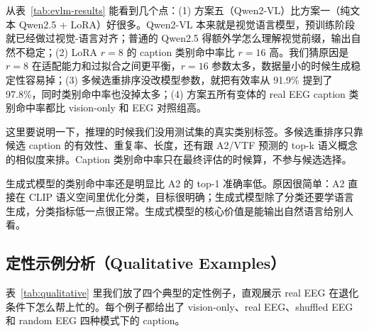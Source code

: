 从表~\ref{tab:evlm-results} 能看到几个点：(1) 方案五（Qwen2-VL）比方案一（纯文本 Qwen2.5 + LoRA）好很多。Qwen2-VL 本来就是视觉语言模型，预训练阶段就已经做过视觉-语言对齐；普通的 Qwen2.5 得额外学怎么理解视觉前缀，输出自然不稳定；(2) LoRA $r=8$ 的 caption 类别命中率比 $r=16$ 高。我们猜原因是 $r=8$ 在适配能力和过拟合之间更平衡，$r=16$ 参数太多，数据量小的时候生成稳定性容易掉；(3) 多候选重排序没改模型参数，就把有效率从 91.9\% 提到了 97.8\%，同时类别命中率也没掉太多；(4) 方案五所有变体的 real EEG caption 类别命中率都比 vision-only 和 EEG 对照组高。

这里要说明一下，推理的时候我们没用测试集的真实类别标签。多候选重排序只靠候选 caption 的有效性、重复率、长度，还有跟 A2/VTF 预测的 top-k 语义概念的相似度来排。Caption 类别命中率只在最终评估的时候算，不参与候选选择。

生成式模型的类别命中率还是明显比 A2 的 top-1 准确率低。原因很简单：A2 直接在 CLIP 语义空间里优化分类，目标很明确；生成式模型除了分类还要学语言生成，分类指标低一点很正常。生成式模型的核心价值是能输出自然语言给别人看。

\subsection{定性示例分析（Qualitative Examples）}

表~\ref{tab:qualitative} 里我们放了四个典型的定性例子，直观展示 real EEG 在退化条件下怎么帮上忙的。每个例子都给出了 vision-only、real EEG、shuffled EEG 和 random EEG 四种模式下的 caption。

